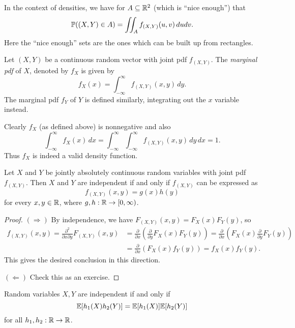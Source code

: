 \begin{remark}
  In the context of densities, we have for
  $A \subseteq \mathbb{R}^2$ (which is ``nice enough'') that
  \[
    \mathbb{P}((X, Y) \in A) = \iint_A f_{(X, Y)}(u, v) \, du dv.
  \]
  Here the ``nice enough'' sets are the ones which
  can be built up from rectangles.
\end{remark}

\begin{definition}
  Let $(X, Y)$ be a continuous random vector
  with joint pdf $f_{(X, Y)}$. The \emph{marginal pdf}
  of $X$, denoted by $f_X$ is given by
  \[
    f_X(x) = \int_{-\infty}^\infty f_{(X, Y)}(x, y) \, dy.
  \]
  The marginal pdf $f_Y$ of $Y$ is defined similarly,
  integrating out the $x$ variable instead.
\end{definition}

\begin{remark}
  Clearly $f_X$ (as defined above) is nonnegative
  and also
  \[
    \int_{-\infty}^\infty f_X(x) \, dx
    = \int_{-\infty}^\infty \int_{-\infty}^\infty f_{(X, Y)}(x, y) \, dy \, dx
    = 1.
  \]
  Thus $f_X$ is indeed a valid density function.
\end{remark}

\begin{prop}
  Let $X$ and $Y$ be jointly absolutely continuous
  random variables with joint pdf $f_{(X, Y)}$.
  Then $X$ and $Y$ are independent if and only if
  $f_{(X, Y)}$ can be expressed as
  \[
    f_{(X, Y)}(x, y) = g(x) h(y)
  \]
  for every $x, y \in \mathbb{R}$, where $g, h : \mathbb{R} \to [0, \infty)$.
\end{prop}

\begin{proof}
  $(\Rightarrow)$ By independence, we have
  $F_{(X, Y)}(x, y) = F_X(x) F_Y(y)$, so
  \begin{align*}
    f_{(X, Y)}(x, y)
    = \frac{\partial^2}{\partial x \partial y} F_{(X, Y)}(x, y)
    &= \frac{\partial}{\partial x} \left(\frac{\partial}{\partial y} F_X(x) F_Y(y)\right)
    = \frac{\partial}{\partial x} \left(F_X(x) \frac{\partial}{\partial y} F_Y(y)\right) \\
    &= \frac{\partial}{\partial x}\left(F_X(x) f_Y(y)\right)
    = f_X(x) f_Y(y).
  \end{align*}
  This gives the desired conclusion in this direction.

  $(\Leftarrow)$ Check this as an exercise.
\end{proof}

\begin{prop}
  Random variables $X, Y$ are independent if and
  only if
  \[\mathbb{E}[h_1(X) h_2(Y)] = \mathbb{E}[h_1(X)] \mathbb{E}[h_2(Y)]\]
  for all $h_1, h_2 : \mathbb{R} \to \mathbb{R}$.
\end{prop}

